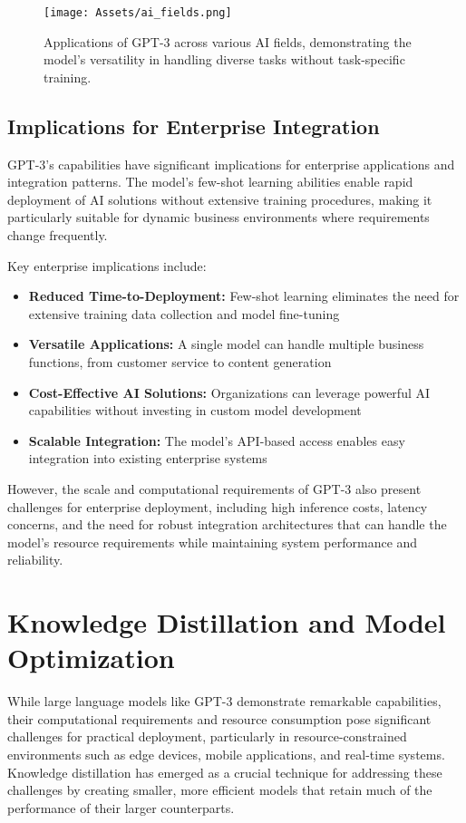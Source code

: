 \begin{figure}[H]
    \centering
    \texttt{[image: Assets/ai\_fields.png]}
    \caption{Applications of GPT-3 across various AI fields, demonstrating the model's versatility in handling diverse tasks without task-specific training.\cite{aiKeyConcepts}}
    \label{fig:ai_fields}
\end{figure}

\subsection{Implications for Enterprise Integration}

GPT-3's capabilities have significant implications for enterprise applications and integration patterns. The model's few-shot learning abilities enable rapid deployment of AI solutions without extensive training procedures, making it particularly suitable for dynamic business environments where requirements change frequently.

Key enterprise implications include:
\begin{itemize}
    \item \textbf{Reduced Time-to-Deployment:} Few-shot learning eliminates the need for extensive training data collection and model fine-tuning
    \item \textbf{Versatile Applications:} A single model can handle multiple business functions, from customer service to content generation
    \item \textbf{Cost-Effective AI Solutions:} Organizations can leverage powerful AI capabilities without investing in custom model development
    \item \textbf{Scalable Integration:} The model's API-based access enables easy integration into existing enterprise systems
\end{itemize}

However, the scale and computational requirements of GPT-3 also present challenges for enterprise deployment, including high inference costs, latency concerns, and the need for robust integration architectures that can handle the model's resource requirements while maintaining system performance and reliability.

\section{Knowledge Distillation and Model Optimization}

While large language models like GPT-3 demonstrate remarkable capabilities, their computational requirements and resource consumption pose significant challenges for practical deployment, particularly in resource-constrained environments such as edge devices, mobile applications, and real-time systems. Knowledge distillation has emerged as a crucial technique for addressing these challenges by creating smaller, more efficient models that retain much of the performance of their larger counterparts.

